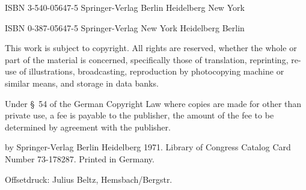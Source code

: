 ISBN 3-540-05647-5 Springer-Verlag Berlin \textperiodcentered{} Heidelberg \textperiodcentered{} New York\par
ISBN 0-387-05647-5 Springer-Verlag New York \textperiodcentered{} Heidelberg \textperiodcentered{} Berlin

This work is subject to copyright. All rights are reserved, whether the whole
or part of the material is concerned, specifically those of translation,
reprinting, re-use of illustrations, broadcasting, reproduction by photocopying
machine or similar means, and storage in data banks.

Under \S~54 of the German Copyright Law where copies are made for other than
private use, a fee is payable to the publisher, the amount of the fee to be
determined by agreement with the publisher.

\textcopyright{} by Springer-Verlag Berlin \textperiodcentered{} Heidelberg 1971.
Library of Congress Catalog Card Number 73-178287. Printed in Germany.

Offsetdruck: Julius Beltz, Hemsbach/Bergstr.

